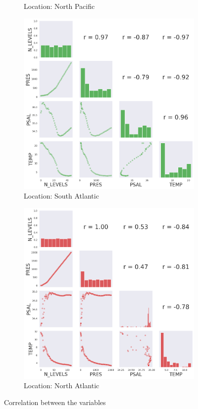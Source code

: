 \documentclass[12pt]{article}
\begin{document}
\begin{figure}
\begin{subfigure}{.5\textwidth}
        \caption{Location: North Pacific}
        \end{subfigure}
        \begin{subfigure}{.5\textwidth}
            \centering
            \includegraphics[width=1\textwidth]{correlation3.png}
        \caption{Location: South Atlantic}
        \end{subfigure}%
        \begin{subfigure}{.5\textwidth}
            \centering
            \includegraphics[width=1\textwidth]{correlation4.png}
        \caption{Location: North Atlantic}
        \end{subfigure}%
        \caption[short]{Correlation between the variables}
        \label{corr}
        \end{figure}
    
\end{document}
